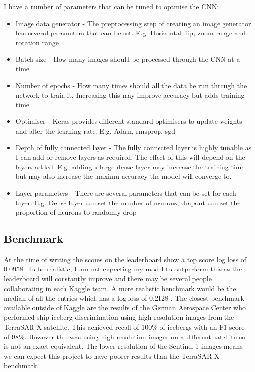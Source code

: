 \documentclass{article}
\begin{document}
I have a number of parameters that can be tuned to optmise the CNN:
\begin{itemize}
\item Image data generator - The preprocessing step of creating an image generator has several parameters that can be set. E.g. Horizontal flip, zoom range and rotation range
\item Batch size - How many images should be processed through the CNN at a time
\item Number of epochs - How many times should all the data be run through the network to train it. Increasing this may improve accuracy but adds training time
\item Optimiser - Keras provides different standard optimisers to update weights and alter the learning rate. E.g. Adam, rmsprop, sgd
\item Depth of fully connected layer - The fully connected layer is highly tunable as I can add or remove layers as required. The effect of this will depend on the layers added. E.g. adding a large dense layer may increase the training time but may also increase the maximu accuracy the model will converge to. 
\item Layer parameters - There are several parameters that can be set for each layer. E.g. Dense layer can set the number of neurons, dropout can set the proportion of neurons to randomly drop
\end{itemize}

\subsection{Benchmark}
At the time of writing the scores on the leaderboard show a top score log loss of 0.0958. To be realistic, I am not expecting my model to outperform this as the leaderboard will constantly improve and there may be several people collaborating in each Kaggle team. A more realistic benchmark would be the median of all the entries which has a log loss of 0.2128 \cite{kaggle}.
The closest benchmark available outside of Kaggle are the results of the German Aerospace Center \cite{bentes} who performed ship-iceberg discrimination using high resolution images from the TerraSAR-X satellite. This achieved recall of 100\% of icebergs with an F1-score of 98\%. However this was using high resolution images on a different satellite so is not an exact equivalent. The lower resolution of the Sentinel-1 images means we can expect this project to have poorer results than the TerraSAR-X benchmark. 
\end{document}
